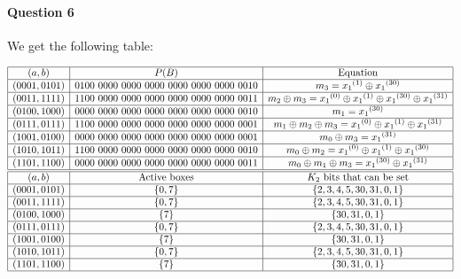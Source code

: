 \documentclass[a4paper]{article}
\begin{document}
\paragraph{Question 6}

We get the following table:

\begin{equation*}
  \begin{array}{|c|c|c|}
    \hline
    (a,b) & P(B) & \text{Equation} \\
    \hline
    (0001,0101) & 0100\ 0000\ 0000\ 0000\ 0000\ 0000\ 0000\ 0010 & m_3 = {x_1}^{(1)} \oplus {x_1}^{(30)} \\
    \hline
    (0011,1111) & 1100\ 0000\ 0000\ 0000\ 0000\ 0000\ 0000\ 0011 & m_2 \oplus m_3 = {x_1}^{(0)} \oplus {x_1}^{(1)} \oplus {x_1}^{(30)} \oplus {x_1}^{(31)} \\
    \hline
    (0100,1000) & 0000\ 0000\ 0000\ 0000\ 0000\ 0000\ 0000\ 0010 & m_1 = {x_1}^{(30)} \\
    \hline
    (0111,0111) & 1100\ 0000\ 0000\ 0000\ 0000\ 0000\ 0000\ 0001 & m_1 \oplus m_2 \oplus m_3 = {x_1}^{(0)} \oplus {x_1}^{(1)} \oplus {x_1}^{(31)} \\
    \hline
    (1001,0100) & 0000\ 0000\ 0000\ 0000\ 0000\ 0000\ 0000\ 0001 & m_0 \oplus m_3 = {x_1}^{(31)} \\
    \hline
    (1010,1011) & 1100\ 0000\ 0000\ 0000\ 0000\ 0000\ 0000\ 0010 & m_0 \oplus m_2 = {x_1}^{(0)} \oplus {x_1}^{(1)} \oplus {x_1}^{(30)} \\
    \hline
    (1101,1100) & 0000\ 0000\ 0000\ 0000\ 0000\ 0000\ 0000\ 0011 & m_0 \oplus m_1 \oplus m_3 = {x_1}^{(30)} \oplus {x_1}^{(31)} \\
    \hline
    \hline
    (a,b) & \text{Active boxes} & K_2 \text{ bits that can be set} \\
    \hline
    (0001,0101) & \{0, 7\} & \{2, 3, 4, 5, 30, 31, 0, 1\} \\
    \hline
    (0011,1111) & \{0, 7\} & \{2, 3, 4, 5, 30, 31, 0, 1\} \\
    \hline
    (0100,1000) & \{7\} & \{30, 31, 0, 1\} \\
    \hline
    (0111,0111) & \{0, 7\} & \{2, 3, 4, 5, 30, 31, 0, 1\} \\
    \hline
    (1001,0100) & \{7\} & \{30, 31, 0, 1\} \\
    \hline
    (1010,1011) & \{0, 7\} & \{2, 3, 4, 5, 30, 31, 0, 1\} \\
    \hline
    (1101,1100) & \{7\} & \{30, 31, 0, 1\}  \\
    \hline
  \end{array}
\end{equation*}
\end{document}
